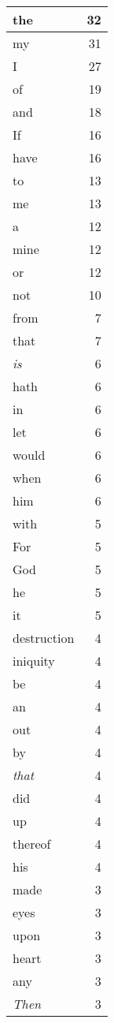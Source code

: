 \begin{center}
\begin{longtable}{l|r}
\hline \hline
\endlastfoot
the & 32 \\ \hline
my & 31 \\ \hline
I & 27 \\ \hline
of & 19 \\ \hline
and & 18 \\ \hline
If & 16 \\ \hline
have & 16 \\ \hline
to & 13 \\ \hline
me & 13 \\ \hline
a & 12 \\ \hline
mine & 12 \\ \hline
or & 12 \\ \hline
not & 10 \\ \hline
from & 7 \\ \hline
that & 7 \\ \hline
\emph{is} & 6 \\ \hline
hath & 6 \\ \hline
in & 6 \\ \hline
let & 6 \\ \hline
would & 6 \\ \hline
when & 6 \\ \hline
him & 6 \\ \hline
with & 5 \\ \hline
For & 5 \\ \hline
God & 5 \\ \hline
he & 5 \\ \hline
it & 5 \\ \hline
destruction & 4 \\ \hline
iniquity & 4 \\ \hline
be & 4 \\ \hline
an & 4 \\ \hline
out & 4 \\ \hline
by & 4 \\ \hline
\emph{that} & 4 \\ \hline
did & 4 \\ \hline
up & 4 \\ \hline
thereof & 4 \\ \hline
his & 4 \\ \hline
made & 3 \\ \hline
eyes & 3 \\ \hline
upon & 3 \\ \hline
heart & 3 \\ \hline
any & 3 \\ \hline
\emph{Then} & 3 \\ \hline

\end{longtable}
\end{center}
